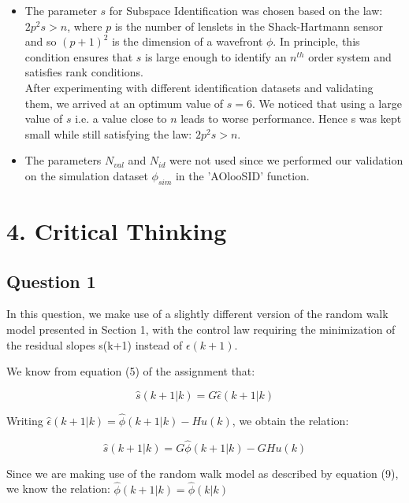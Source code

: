 \documentclass[12pt]{report}
\begin{document}
\begin{itemize}
	\item The parameter $s$ for Subspace Identification was chosen based on the law: $2p^2s > n$, where $p$ is the number of lenslets in the Shack-Hartmann sensor and so $(p+1)^2$ is the dimension of a wavefront $\phi$. In principle, this condition ensures that $s$ is large enough to identify an $n^{th}$ order system and satisfies rank conditions.\\
	After experimenting  with different identification datasets and validating them, we arrived at an optimum value of $s = 6$. We noticed that using a large value of $s$ i.e. a value close to $n$ leads to worse performance. Hence s was kept small while still satisfying the law: $2p^2s > n$.
	\item The parameters $N_{val}$ and $N_{id}$ were not used since we performed our validation on the simulation dataset $\phi_{sim}$ in the 'AOlooSID' function.
	
\end{itemize}

\newpage
\section*{4. Critical Thinking}

\subsection*{Question 1}

In this question, we make use of a slightly different version of the random walk model presented in Section 1, with the control law requiring the minimization of the residual slopes s(k+1) instead of $\epsilon(k+1)$.

We know from equation (5) of the assignment that:

\begin{equation*}
\hat{s}(k+1|k) = G\hat\epsilon(k+1|k)
\end{equation*}

Writing $\hat\epsilon(k+1|k) = \hat\phi(k+1|k) - Hu(k)$, we obtain the relation:

\begin{equation*}
\hat{s}(k+1|k) = G\hat\phi(k+1|k) - GHu(k)
\end{equation*}

Since we are making use of the random walk model as described by equation (9), we know the relation: $\hat\phi(k+1|k) = \hat\phi(k|k)$
\end{document}
